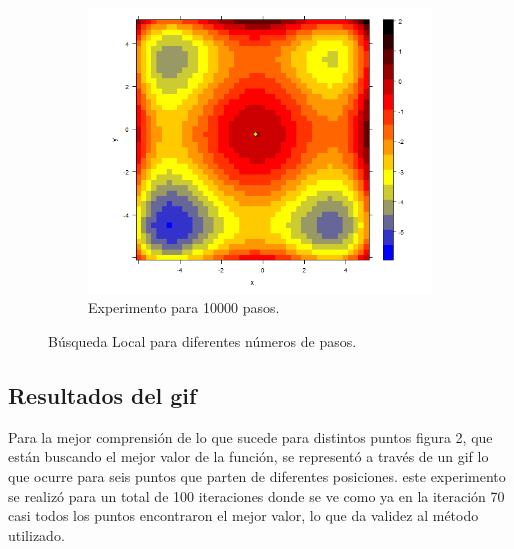 \documentclass{article}
\begin{document}
\begin{figure}
		\begin{subfigure}[b]{0.45\linewidth}
			\includegraphics[width=\linewidth]{t710000.png}
			\caption{Experimento para 10000 pasos.}
			\label{3}
	\end{subfigure}
	\caption{Búsqueda Local para diferentes números de pasos.}  		
\end{figure}

\subsection{Resultados del gif}

Para la mejor comprensión de lo que sucede para distintos puntos figura 2, que están buscando el mejor valor de la función, se representó a través de un gif lo que ocurre para seis puntos que parten de diferentes posiciones. este experimento se realizó para un total de 100 iteraciones donde se ve como ya en la iteración 70 casi todos los puntos encontraron el mejor valor, lo que da validez al método utilizado. 
\end{document}
